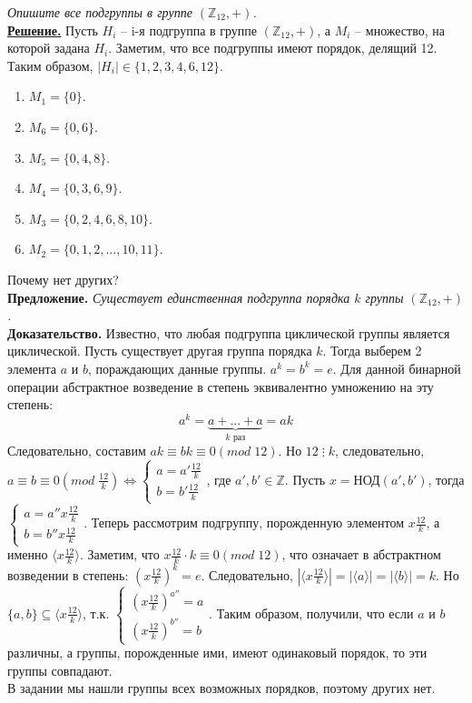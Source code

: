 \documentclass[14pt,a4paper]{scrartcl}
\begin{document}
\begin{spacing}{1}
\begin{center}
\end{center}
\textit{Опишите все подгруппы в группе $(\mathbb{Z}_{12}, +)$.}\\
\noindent \textbf{\underline{Решение.}} Пусть $H_i$ -- i-я подгруппа в группе $(\mathbb{Z}_{12}, +)$, а $M_i$ -- множество, на которой задана $H_i$. Заметим, что все подгруппы имеют порядок, делящий 12. Таким образом, $|H_i| \in \{1, 2, 3, 4, 6, 12\}$. 
\begin{enumerate}
	\item $M_1 = \{0\}$. 
	\item $M_6 = \{0, 6\}$.
	\item $M_5 = \{0, 4, 8\}$.
	\item $M_4 = \{0, 3, 6, 9\}$.
	\item $M_3 = \{0, 2, 4, 6, 8, 10\}$.
	\item $M_2 = \{0, 1, 2, ..., 10, 11\}$.
\end{enumerate}
Почему нет других?\\
\textbf{Предложение.} \textit{Существует единственная подгруппа порядка $k$ группы $(\mathbb{Z}_{12}, +)$.}\\
\textbf{Доказательство.} Известно, что любая подгруппа циклической группы является циклической. Пусть существует другая группа порядка $k$. Тогда выберем 2 элемента $a$ и $b$, пораждающих данные группы. $a^k = b^k = e$. Для данной бинарной операции абстрактное возведение в степень эквивалентно умножению на эту степень: $$a^k = \underbrace{a +...+a}_{k\text{ раз}} = ak$$
Следовательно, составим $ak \equiv bk \equiv 0 (mod\;12)$. Но $12\;\vdots\;k$, следовательно, \\ 
$a \equiv b \equiv 0(mod\;\frac{12}{k}) \Leftrightarrow \begin{cases}
	a = a'\frac{12}{k}\\
	b = b'\frac{12}{k}
\end{cases}$, где $a', b' \in \mathbb{Z}$. Пусть $x = \text{НОД}(a', b')$, тогда $\begin{cases}
	a = a''x \frac{12}{k}\\
	b = b''x\frac{12}{k}
\end{cases}$. Теперь рассмотрим подгруппу, порожденную элементом $x\frac{12}{k}$, а именно $\langle x\frac{12}{k} \rangle$. Заметим, что $x\frac{12}{k} \cdot k \equiv 0(mod\;12)$, что означает в абстрактном возведении в степень: $(x\frac{12}{k})^k = e$. Следовательно, $|\langle x\frac{12}{k} \rangle| =|\langle a \rangle| = |\langle b \rangle| = k$. Но $\{a, b\} \subseteq \langle x\frac{12}{k} \rangle$, т.к. 
$
\begin{cases}
	(x\frac{12}{k})^{a''} = a \\
	(x\frac{12}{k})^{b''} = b
\end{cases}
$. Таким образом, получили, что если $a$ и $b$ различны, а группы, порожденные ими, имеют одинаковый порядок, то эти группы совпадают.\\
В задании мы нашли группы всех возможных порядков, поэтому других нет.



\end{spacing}
\end{document}
